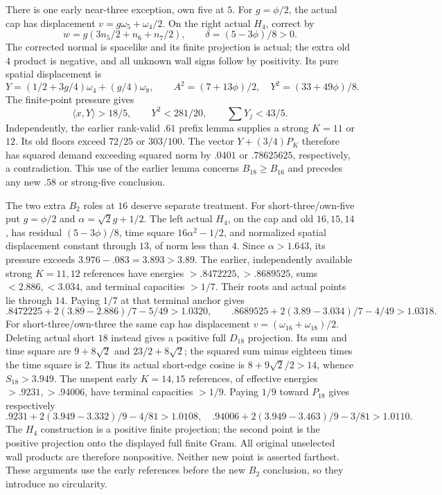 \documentclass[11pt]{article}
\theoremstyle{definition}
\theoremstyle{remark}
\newcommand{\ip}[2]{\langle #1,#2\rangle}
\begin{document}
There is one early near-three exception, own five at \(5\).
For \(g=\phi/2\), the actual cap has displacement
\(v=g\omega_5+\omega_4/2\). On the right actual \(H_4\), correct by
\[
 w=g(3n_5/2+n_6+n_7/2),\qquad
 \delta=(5-3\phi)/8>0.
\]
The corrected normal is spacelike and its finite projection is
actual; the extra old \(4\) product is negative, and all unknown
wall signs follow by positivity. Its pure spatial displacement is
\[
 Y=(1/2+3g/4)\omega_4+(g/4)\omega_8,\qquad
 A^2=(7+13\phi)/2,\quad Y^2=(33+49\phi)/8.
\]
The finite-point pressure gives
\[
 \ip xY>18/5,\qquad Y^2<281/20,\qquad
 \sum Y_j<43/5.
\]
Independently, the earlier rank-valid \(.61\) prefix lemma supplies
a strong \(K=11\) or \(12\). Its old floors exceed \(72/25\)
or \(303/100\). The vector \(Y+(3/4)P_K\) therefore has
squared demand exceeding squared norm by \(.0401\) or
\(.78625625\), respectively, a contradiction.
This use of the earlier lemma concerns \(B_{18}\geq B_{16}\)
and precedes any new \(.58\) or strong-five conclusion.

The two extra \(B_2\) roles at \(16\) deserve separate treatment.
For short-three/own-five put \(g=\phi/2\) and
\(\alpha=\sqrt2g+1/2\). The left actual \(H_4\), on the cap and
old \(16,15,14\), has residual \((5-3\phi)/8\), time square
\(16\alpha^2-1/2\), and normalized spatial displacement constant
through \(13\), of norm less than \(4\). Since \(\alpha>1.643\),
its pressure exceeds \(3.976-.083=3.893>3.89\).
The earlier, independently available strong \(K=11,12\) references
have energies \(>.8472225,>.8689525\), sums \(<2.886,<3.034\),
and terminal capacities \(>1/7\). Their roots and actual points
lie through \(14\). Paying \(1/7\) at that terminal anchor gives
\[
 .8472225+2(3.89-2.886)/7-5/49>1.0320,
 \qquad
 .8689525+2(3.89-3.034)/7-4/49>1.0318.
\]
For short-three/own-three the same cap has displacement
\(v=(\omega_{16}+\omega_{18})/2\). Deleting actual short \(18\)
instead gives a positive full \(D_{18}\) projection. Its sum and
time square are \(9+8\sqrt2\) and \(23/2+8\sqrt2\); the squared
sum minus eighteen times the time square is \(2\). Thus its actual
short-edge cosine is \(8+9\sqrt2/2>14\), whence \(S_{18}>3.949\).
The unspent early \(K=14,15\) references, of effective energies
\(>.9231,>.94006\), have terminal capacities \(>1/9\).
Paying \(1/9\) toward \(P_{18}\) gives respectively
\[
 .9231+2(3.949-3.332)/9-4/81>1.0108,
 \quad .94006+2(3.949-3.463)/9-3/81>1.0110.
\]
The \(H_4\) construction is a positive finite projection; the second
point is the positive projection onto the displayed full finite Gram.
All original unselected wall products are therefore nonpositive.
Neither new point is asserted farthest. These arguments use the
early references before the new \(B_2\) conclusion, so they introduce
no circularity.
\end{document}
